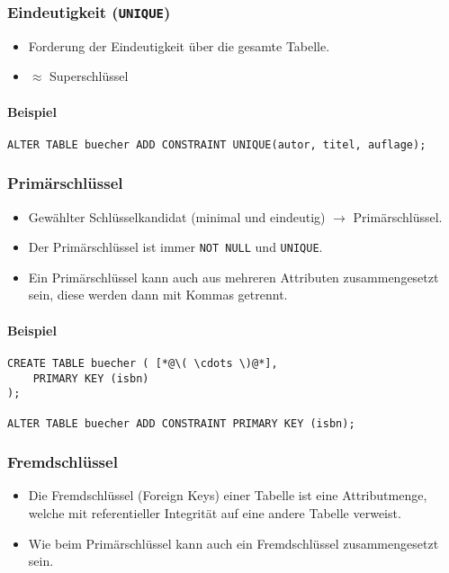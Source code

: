             \subsubsection{Eindeutigkeit (\lstinline|UNIQUE|)} %
                \begin{itemize}
                	\item Forderung der Eindeutigkeit über die gesamte Tabelle.
                	\item[] \( \approx \) Superschlüssel
                \end{itemize}
            
            	\paragraph{Beispiel}
            		\begin{lstlisting}
ALTER TABLE buecher ADD CONSTRAINT UNIQUE(autor, titel, auflage);
            		\end{lstlisting}

            \subsubsection{Primärschlüssel} %
                \begin{itemize}
                	\item Gewählter Schlüsselkandidat (minimal und eindeutig) \(\rightarrow\) Primärschlüssel.
                	\item Der Primärschlüssel ist immer \lstinline|NOT NULL| und \lstinline|UNIQUE|.
                	\item Ein Primärschlüssel kann auch aus mehreren Attributen zusammengesetzt sein, diese werden dann mit Kommas getrennt.
                \end{itemize}
            
            	\paragraph{Beispiel}
            		\begin{lstlisting}
CREATE TABLE buecher ( [*@\( \cdots \)@*],
	PRIMARY KEY (isbn)
);

ALTER TABLE buecher ADD CONSTRAINT PRIMARY KEY (isbn);
            		\end{lstlisting}

            \subsubsection{Fremdschlüssel} %
                \begin{itemize}
                	\item Die Fremdschlüssel (Foreign Keys) einer Tabelle ist eine Attributmenge, welche mit referentieller Integrität auf eine andere Tabelle verweist.
                	\item Wie beim Primärschlüssel kann auch ein Fremdschlüssel zusammengesetzt sein.
                \end{itemize}
            
